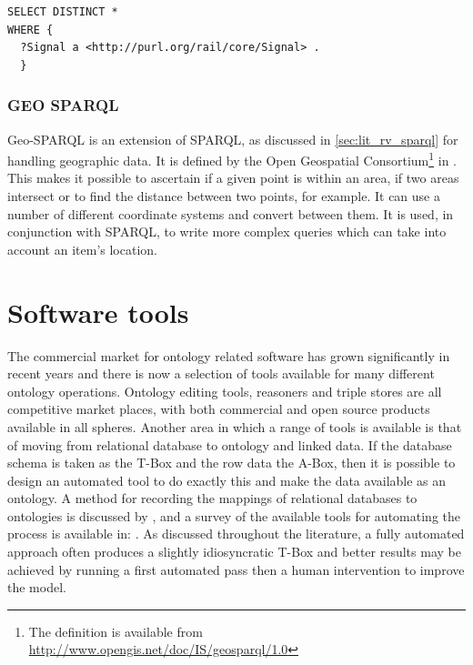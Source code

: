 \begin{lstlisting}[label={lst:sparqlexample}, caption={SPARQL to select all signals from a datastore. Note that this query would potentially return a very large number of results.},language={sparql},frame=tb]
SELECT DISTINCT *
WHERE {
  ?Signal a <http://purl.org/rail/core/Signal> .
  }
\end{lstlisting}

\subsubsection{GEO SPARQL}
Geo-SPARQL is an extension of SPARQL, as discussed in \autoref{sec:lit_rv_sparql} for handling geographic data. It is defined by the Open Geospatial Consortium\footnote{The definition is available from \url{http://www.opengis.net/doc/IS/geosparql/1.0}} in \citet{Perry2012}. This makes it possible to ascertain if a given point is within an area, if two areas intersect or to find the distance between two points, for example. It can use a number of different coordinate systems and convert between them. It is used, in conjunction with SPARQL, to write more complex queries which can take into account an item's location.

\section{Software tools}
The commercial market for ontology related software has grown significantly in recent years and there is now a selection of tools available for many different ontology operations. Ontology editing tools, reasoners and triple stores are all competitive market places, with both commercial and open source products available in all spheres. Another area in which a range of tools is available is that of moving from relational database to ontology and linked data. If the database schema is taken as the T-Box and the row data the A-Box, then it is possible to design an automated tool to do exactly this and make the data available as an ontology. A method for recording the mappings of relational databases to ontologies is discussed by \citet{Dimou2014}, and a survey of the available tools for automating the process is available in: \cite{May2017}. As discussed throughout the literature, a fully automated approach often produces a slightly idiosyncratic T-Box and better results may be achieved by running a first automated pass then a human intervention to improve the model.

